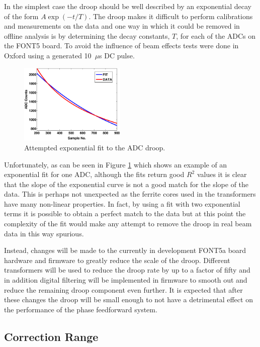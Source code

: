 In the simplest case the droop should be well described by an exponential decay of the form \(A\exp\left(-t/T\right)\). The droop makes it difficult to perform calibrations and measurements on the data and one way in which it could be removed in offline analysis is by determining the decay constants, \(T\), for each of the ADCs on the FONT5 board. To avoid the influence of beam effects tests were done in Oxford using a generated 10~\(\mu\)s DC pulse.

\begin{figure}
  \centering
  \includegraphics[width=0.45\textwidth]{Figures/droopFit}
  \caption{Attempted exponential fit to the ADC droop.}
  \label{f:droopFit}
\end{figure}

Unfortunately, as can be seen in Figure \ref{f:droopFit} which shows an example of an exponential fit for one ADC, although the fits return good \(R^{2}\) values it is clear that the slope of the exponential curve is not a good match for the slope of the data. This is perhaps not unexpected as the ferrite cores used in the transformers have many non-linear properties. In fact, by using a fit with two exponential terms it is possible to obtain a perfect match to the data but at this point the complexity of the fit would make any attempt to remove the droop in real beam data in this way spurious.

Instead, changes will be made to the currently in development FONT5a board hardware and firmware to greatly reduce the scale of the droop. Different transformers will be used to reduce the droop rate by up to a factor of fifty and in addition digital filtering will be implemented in firmware to smooth out and reduce the remaining droop component even further. It is expected that after these changes the droop will be small enough to not have a detrimental effect on the performance of the phase feedforward system. 


\subsection{Correction Range}
\label{ss:corrRange}


